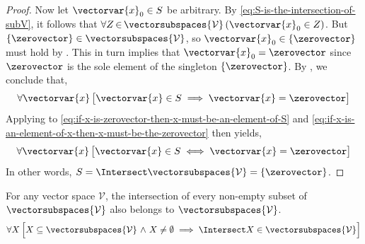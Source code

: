 \begin{proof}
    \vspace{0.3cm}
    \noindent
    Now let \( \vectorvar{x}_{0} \in S \) be arbitrary. By \eqref{eq:S-is-the-intersection-of-subV},
    it follows that \( \forall Z\,{\in}\,\vectorsubspaces{\mathcal{V}} \, \mleft( \vectorvar{x}_{0} \in Z \mright) \).
    But \( \mleft\{ \zerovector \mright\} \in \vectorsubspaces{\mathcal{V}} \), so
    \( \vectorvar{x}_{0} \in \mleft\{ \zerovector \mright\} \) must hold by .
    This in turn implies that \( \vectorvar{x}_{0} = \zerovector \) since \( \zerovector \) is the sole element of the singleton \( \mleft\{ \zerovector \mright\} \).
    By , we conclude that,
    \begin{equation}
        \label{eq:if-x-is-an-element-of-x-then-x-must-be-the-zerovector}
        \forall \vectorvar{x} \, \big[ \vectorvar{x} \in S \implies \vectorvar{x} = \zerovector \big]
    \end{equation}
    Applying  to \eqref{eq:if-x-is-zerovector-then-x-must-be-an-element-of-S}
    and \eqref{eq:if-x-is-an-element-of-x-then-x-must-be-the-zerovector} then yields,
    \begin{equation*}
        \forall \vectorvar{x} \, \big[ \vectorvar{x} \in S \iff \vectorvar{x} = \zerovector \big]
    \end{equation*}
    In other words, \( S = \Intersect \vectorsubspaces{\mathcal{V}} = \mleft\{ \zerovector \mright\} \).
\end{proof}

\begin{thm}
     \label{thm:intersection-of-a-collection-of-vector-subspaces-is-also-a-vector-subspace}
    For any vector space \( \mathcal{V} \), the intersection of every non-empty subset of \( \vectorsubspaces{\mathcal{V}} \)
    also belongs to \( \vectorsubspaces{\mathcal{V}} \).
    \begin{equation*}
        \forall X \, \Big[ X \subseteq \vectorsubspaces{\mathcal{V}} \,\,{\land}\,\, X \neq \emptyset \implies \Intersect X \in \vectorsubspaces{\mathcal{V}} \Big]
    \end{equation*}
\end{thm}

